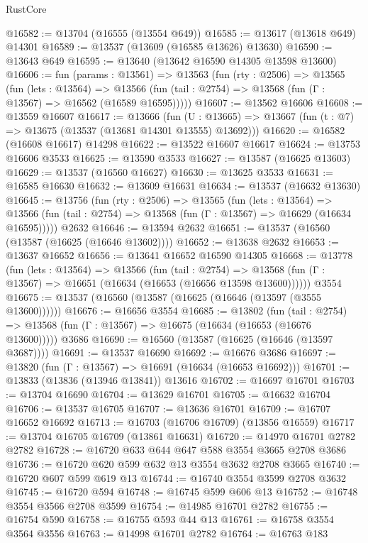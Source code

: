 \begin{lexlean}{RustCore}
\begin{coremodule}
@16582 := @13704 (@16555 (@13554 @649))
@16585 := @13617 (@13618 @649) @14301
@16589 := @13537 (@13609 (@16585 @13626) @13630)
@16590 := @13643 @649
@16595 := @13640 (@13642 @16590 @14305 @13598 @13600)
@16606 := fun (params : @13561) =>
  @13563
    (fun (rty : @2506) =>
    @13565
      (fun (lets : @13564) =>
      @13566 (fun (tail : @2754) => @13568 (fun (Γ : @13567) => @16562 (@16589 @16595)))))
@16607 := @13562 @16606
@16608 := @13559 @16607
@16617 := @13666
    (fun (U : @13665) => @13667 (fun (t : @7) => @13675 (@13537 (@13681 @14301 @13555) @13692)))
@16620 := @16582 (@16608 @16617) @14298
@16622 := @13522 @16607 @16617
@16624 := @13753 @16606 @3533
@16625 := @13590 @3533
@16627 := @13587 (@16625 @13603)
@16629 := @13537 (@16560 @16627)
@16630 := @13625 @3533
@16631 := @16585 @16630
@16632 := @13609 @16631
@16634 := @13537 (@16632 @13630)
@16645 := @13756
    (fun (rty : @2506) =>
    @13565
      (fun (lets : @13564) =>
      @13566 (fun (tail : @2754) => @13568 (fun (Γ : @13567) => @16629 (@16634 @16595)))))
    @2632
@16646 := @13594 @2632
@16651 := @13537 (@16560 (@13587 (@16625 (@16646 @13602))))
@16652 := @13638 @2632
@16653 := @13637 @16652
@16656 := @13641 @16652 @16590 @14305
@16668 := @13778
    (fun (lets : @13564) =>
    @13566
      (fun (tail : @2754) =>
      @13568 (fun (Γ : @13567) => @16651 (@16634 (@16653 (@16656 @13598 @13600))))))
    @3554
@16675 := @13537 (@16560 (@13587 (@16625 (@16646 (@13597 (@3555 @13600))))))
@16676 := @16656 @3554
@16685 := @13802
    (fun (tail : @2754) => @13568 (fun (Γ : @13567) => @16675 (@16634 (@16653 (@16676 @13600)))))
    @3686
@16690 := @16560 (@13587 (@16625 (@16646 (@13597 @3687))))
@16691 := @13537 @16690
@16692 := @16676 @3686
@16697 := @13820 (fun (Γ : @13567) => @16691 (@16634 (@16653 @16692)))
@16701 := @13833 (@13836 (@13946 @13841)) @13616
@16702 := @16697 @16701
@16703 := @13704 @16690
@16704 := @13629 @16701
@16705 := @16632 @16704
@16706 := @13537 @16705
@16707 := @13636 @16701
@16709 := @16707 @16652 @16692
@16713 := @16703 (@16706 @16709) (@13856 @16559)
@16717 := @13704 @16705 @16709 (@13861 @16631)
@16720 := @14970 @16701 @2782 @2782
@16728 := @16720 @633 @644 @647 @588 @3554 @3665 @2708 @3686
@16736 := @16720 @620 @599 @632 @13 @3554 @3632 @2708 @3665
@16740 := @16720 @607 @599 @619 @13
@16744 := @16740 @3554 @3599 @2708 @3632
@16745 := @16720 @594
@16748 := @16745 @599 @606 @13
@16752 := @16748 @3554 @3566 @2708 @3599
@16754 := @14985 @16701 @2782
@16755 := @16754 @590
@16758 := @16755 @593 @44 @13
@16761 := @16758 @3554 @3564 @3556
@16763 := @14998 @16701 @2782
@16764 := @16763 @183

\end{coremodule}
\end{lexlean}
